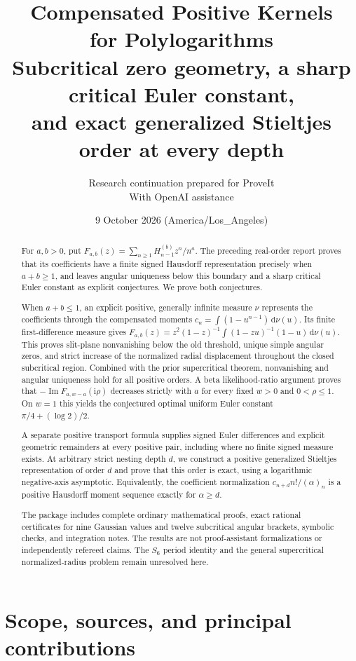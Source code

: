 \documentclass[11pt]{article}
\title{\textbf{Compensated Positive Kernels\\for Polylogarithms}\\[8pt]
\large Subcritical zero geometry, a sharp critical Euler constant,\\and exact generalized Stieltjes order at every depth}
\author{Research continuation prepared for ProveIt\\\small With OpenAI assistance}
\date{9 October 2026 (America/Los\_Angeles)}
\numberwithin{equation}{section}
\theoremstyle{definition}
\theoremstyle{remark}
\DeclareMathOperator{\Impart}{Im}
\newcommand{\dd}{\,\mathrm d}
\newcommand{\ii}{\mathrm i}
\begin{document}
\maketitle
\thispagestyle{empty}
\begin{abstract}
For $a,b>0$, put $F_{a,b}(z)=\sum_{n\ge1}H_{n-1}^{(b)}z^n/n^a$.
The preceding real-order report proves that its coefficients have a finite
signed Hausdorff representation precisely when $a+b\ge1$, and leaves
angular uniqueness below this boundary and a sharp critical Euler constant
as explicit conjectures. We prove both conjectures.

When $a+b\le1$, an explicit positive, generally infinite measure $\nu$
represents the coefficients through the compensated moments
$c_n=\int(1-u^{n-1})\dd\nu(u)$. Its finite first-difference measure gives
$F_{a,b}(z)=z^2(1-z)^{-1}\int(1-zu)^{-1}(1-u)\dd\nu(u)$.
This proves slit-plane nonvanishing below the old threshold, unique simple
angular zeros, and strict increase of the normalized radial displacement
throughout the closed subcritical region. Combined with the prior
supercritical theorem, nonvanishing and angular uniqueness hold for all
positive orders. A beta likelihood-ratio argument proves that
$-\Impart F_{a,w-a}(\ii\rho)$ decreases strictly with $a$ for every fixed
$w>0$ and $0<\rho\le1$. On $w=1$ this yields the conjectured optimal
uniform Euler constant $\pi/4+(\log2)/2$.

A separate positive transport formula supplies signed Euler differences
and explicit geometric remainders at every positive pair, including where
no finite signed measure exists. At arbitrary strict nesting depth $d$,
we construct a positive generalized Stieltjes representation of order $d$
and prove that this order is exact, using a logarithmic negative-axis
asymptotic. Equivalently, the coefficient normalization
$c_{n+d}n!/(\alpha)_n$ is a positive Hausdorff moment sequence exactly for
$\alpha\ge d$.

The package includes complete ordinary mathematical proofs, exact rational
certificates for nine Gaussian values and twelve subcritical angular
brackets, symbolic checks, and integration notes. The results are not
proof-assistant formalizations or independently refereed claims. The
$S_6$ period identity and the general supercritical normalized-radius
problem remain unresolved here.
\end{abstract}
\clearpage
\begingroup\small
\tableofcontents
\endgroup
\clearpage

\section{Scope, sources, and principal contributions}
\label{sec:scope}
\end{document}

